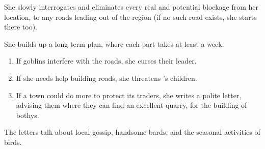 \begin{multicols}{2}
\begin{dlist}
  She slowly interrogates and eliminates every real and potential blockage from her location, to any roads leading out of the region (if no such road exists, she starts there too).

  She builds up a long-term plan, where each part takes at least a week.
  \begin{enumerate}
    \item
    If goblins interfere with the roads, she curses their leader.
    \item
    If she needs help building roads, she threatens 's children.
    \item
    If a town could do more to protect its traders, she writes a polite letter, advising them where they can find an excellent quarry, for the building of \glspl{bothy}.
  \end{enumerate}
  The letters talk about local gossip, handsome bards, and the seasonal activities of birds.
\end{dlist}

\end{multicols}
